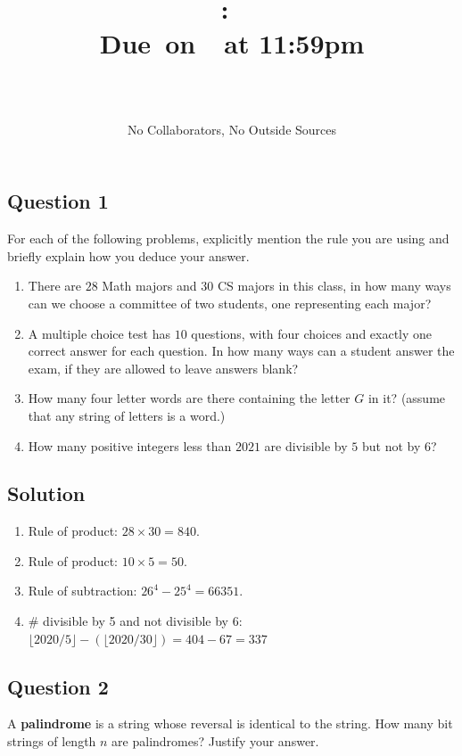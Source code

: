 \documentclass{article}
\title{
    \vspace{2in}
    \textbf{\hmwkClass:\ \hmwkTitle}\\
    \normalsize\vspace{0.1in}\small{Due\ on\ \hmwkDueDate\ at 11:59pm}\\
    \vspace{0.1in}\large{\textit{\hmwkClassInstructor}}
    \vspace{3in}
    \author{\textbf{\hmwkAuthorName} \\ \\ \small No Collaborators, No Outside Sources}
    \date{}
}
\begin{document}
\maketitle
\pagebreak

\subsection*{Question 1}
    For each of the following problems, explicitly mention the rule you are using and briefly explain how you deduce your answer.
    \begin{enumerate}
        \item There are $28$ Math majors and $30$ CS majors in this class, in how many ways can we choose a committee of two students, one representing each major?
        \item A multiple choice test has $10$ questions, with four choices and exactly one correct answer for each question. In how many ways can a student answer the exam, if they are allowed to leave answers blank?
        \item How many four letter words are there containing the letter $G$ in it? (assume that any string of letters is a word.)
        \item How many positive integers less than $2021$ are divisible by $5$ but not by $6$?
    \end{enumerate}

\subsection*{Solution}
    \begin{enumerate}
        \item Rule of product: $28 \times 30 = 840$.
        \item Rule of product: $10 \times 5 = 50$.
        \item Rule of subtraction: $26^{4} - 25^{4} = 66351$.
        \item \# divisible by 5 and not divisible by 6: $\lfloor 2020/5 \rfloor - (\lfloor 2020 / 30 \rfloor) = 404 - 67 = 337$
    \end{enumerate}

\subsection*{Question 2}
    A \textbf{palindrome} is a string whose reversal is identical to the string. How many bit strings of length $n$ are palindromes? Justify your answer.
\end{document}
